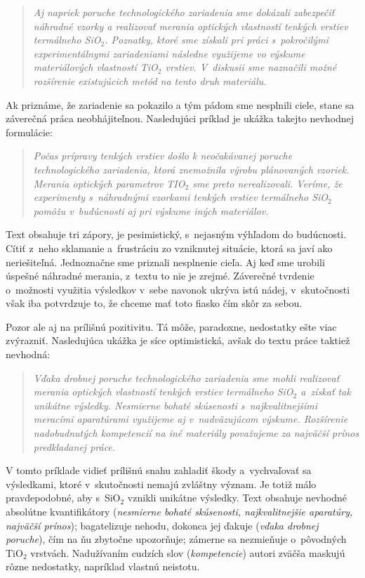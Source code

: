 \documentclass[../../../thesis.tex]{subfiles}
\begin{document}
\begin{quote}
  \emph{Aj napriek poruche technologického zariadenia sme
  dokázali zabezpečiť náhradné vzorky a realizovať merania
  optických vlastností tenkých vrstiev termálneho
  SiO$_\mathit{2}$.
  Poznatky, ktoré sme získali pri práci s~pokročilými
  experimentálnymi zariadeniami následne využijeme vo výskume
  materiálových vlastností TiO$_\mathit{2}$ vrstiev.
  V~diskusii sme naznačili možné rozšírenie existujúcich
  metód na tento druh materiálu.}
\end{quote}

Ak priznáme, že zariadenie sa pokazilo
a tým pádom sme nesplnili ciele,
stane sa záverečná práca neobhájiteľnou.
Nasledujúci príklad je ukážka takejto nevhodnej formulácie:

\begin{quote}
  \emph{Počas prípravy tenkých vrstiev došlo k neočakávanej
  poruche technologického zariadenia,
  ktorá znemožnila výrobu plánovaných vzoriek.
  Merania optických parametrov TIO$_\mathit2$
  sme preto nerealizovali.
  Veríme, že experimenty s~náhradnými vzorkami tenkých vrstiev
  termálneho SiO$_\mathit2$ pomôžu v~budúcnosti
  aj pri výskume iných materiálov.}
\end{quote}

Text obsahuje tri zápory, je pesimistický,
s~nejasným výhľadom do budúcnosti.
Cítiť z~neho sklamanie a~frustráciu zo vzniknutej situácie,
ktorá sa javí ako neriešiteľná.
Jednoznačne sme priznali nesplnenie cieľa.
Aj keď sme urobili úspešné náhradné merania,
z~textu to nie je zrejmé.
Záverečné tvrdenie o~možnosti využitia výsledkov
v~sebe navonok ukrýva istú nádej,
v~skutočnosti však iba potvrdzuje to,
že chceme mať toto fiasko čím skôr za sebou.

Pozor ale aj na prílišnú pozitivitu.
Tá môže, paradoxne, nedostatky ešte viac zvýrazniť.
Nasledujúca ukážka je síce optimistická,
avšak do textu práce taktiež nevhodná:

\begin{quote}
  \emph{Vďaka drobnej poruche technologického zariadenia sme
  mohli realizovať merania optických vlastností tenkých vrstiev
  termálneho SiO$_\mathit2$ a~získať tak unikátne výsledky.
  Nesmierne bohaté skúsenosti s~najkvalitnejšími meracími
  aparatúrami využijeme aj v~nadväzujúcom výskume.
  Rozšírenie nadobudnutých kompetencií na iné materiály
  považujeme za najväčší prínos predkladanej práce.}
\end{quote}

V tomto príklade vidieť prílišnú snahu zahladiť škody
a~vychvaľovať sa výsledkami,
ktoré v~skutočnosti nemajú zvláštny význam.
Je totiž málo pravdepodobné,
aby s~SiO$_2$ vznikli unikátne výsledky.
Text obsahuje nevhodné absolútne kvantifikátory
(\emph{nesmierne bohaté skúsenosti, najkvalitnejšie aparatúry,
najväčší prínos});
bagatelizuje nehodu, dokonca jej ďakuje
(\emph{vďaka drobnej poruche}),
čím na ňu zbytočne upozorňuje;
zámerne sa nezmieňuje o~pôvodných TiO$_2$ vrstvách.
Nadužívaním cudzích slov (\emph{kompetencie})
autori zväčša maskujú rôzne nedostatky,
napríklad vlastnú neistotu.
\end{document}
